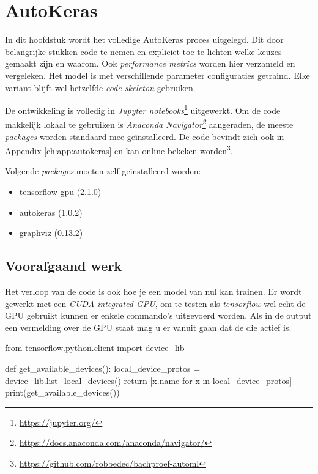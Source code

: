 
\chapter{AutoKeras}
\label{ch:autokeras}

In dit hoofdstuk wordt het volledige AutoKeras proces uitgelegd. Dit door belangrijke stukken code te nemen en expliciet toe te lichten welke keuzes gemaakt zijn en waarom. Ook \textit{performance metrics} worden hier verzameld en vergeleken. Het model is met verschillende parameter configuraties getraind. Elke variant blijft wel hetzelfde \textit{code skeleton} gebruiken.

De ontwikkeling is volledig in \textit{Jupyter notebooks}\footnote{\url{https://jupyter.org/}} uitgewerkt. Om de code makkelijk lokaal te gebruiken is \textit{Anaconda Navigator\footnote{\url{https://docs.anaconda.com/anaconda/navigator/}}} aangeraden, de meeste \textit{packages} worden standaard mee geïnstalleerd. De code bevindt zich ook in Appendix \ref{ch:app:autokeras} en kan online bekeken worden\footnote{\url{https://github.com/robbedec/bachproef-automl}}.

Volgende \textit{packages} moeten zelf geïnstalleerd worden:

\begin{itemize}
    \item tensorflow-gpu (2.1.0)
    \item autokeras (1.0.2)
    \item graphviz (0.13.2)
\end{itemize}

\section{Voorafgaand werk}

Het verloop van de code is ook hoe je een model van nul kan trainen. Er wordt gewerkt met een \textit{CUDA integrated GPU}, om te testen als \textit{tensorflow} wel echt de GPU gebruikt kunnen er enkele commando's uitgevoerd worden. Als in de output een vermelding over de GPU staat mag u er vanuit gaan dat de die actief is.

\begin{python}
from tensorflow.python.client import device_lib

def get_available_devices():
    local_device_protos = device_lib.list_local_devices()
    return [x.name for x in local_device_protos]
print(get_available_devices()) 
\end{python}

